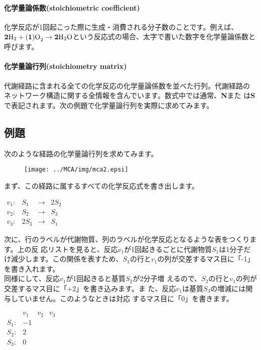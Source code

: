 \paragraph{化学量論係数(stoichiometric coefficient)}
化学反応が1回起こった際に生成・消費される分子数のことです。例えば、${\rm {\bf 2}H}_2 + {\rm ({\bf 1})O}_2 \rightarrow {\rm {\bf 2}H}_2{\rm O}$という反応式の場合、太字で書いた数字を化学量論係数と呼びます。\\

\paragraph{化学量論行列(stoichiometry matrix)}
代謝経路に含まれる全ての化学反応の化学量論係数を並べた行列。代謝経路の
ネットワーク構造に関する全情報を含んでいます。数式中では通常、{\bf N}また
は{\bf S}で表記されます。次の例題で化学量論行列を実際に求めてみます。


\subsection{例題}
次のような経路の化学量論行列を求めてみます。

\begin{figure}[h]
\begin{center}
\texttt{[image: ../MCA/img/mca2.epsi]}
\end{center}
\end{figure}

まず、この経路に属するすべての化学反応式を書き出します。\\

\begin{center}
\(
\begin{array}{lrcr}
v_1: & S_1 & \rightarrow & 2S_2 \\
v_2: & S_2 & \rightarrow & S_3 \\
v_3: & 2S_3 & \rightarrow & S_1 
\end{array}
\)
\end{center}

次に、行のラベルが代謝物質、列のラベルが化学反応となるような表をつくります。上の反
応リストを見ると、反応\(v_1\)が1回起きるごとに代謝物質\(S_1\)は1分子だけ減少します。この関係を表すため、\(S_1\)の行と\(v_1\)の列が交差するマス目に「-1」
を書き入れます。\\

\indent 同様にして、反応\(v_1\)が1回起きると基質\(S_2\)が2分子増
えるので、\(S_2\)の行と\(v_1\)の列が交差するマス目に「+2」を書き込みます。ま
た、反応\(v_1\)は基質\(S_3\)の増減には関与していません。このようなときは対応
するマス目に「0」を書きます。
\begin{center}
\(
\begin{array}{r|rrr}
     & v_1 & v_2 & v_3 \\
\hline
S_1: & -1  &   &  \\
S_2: &  2  &   &  \\
S_3: &  0  &   & \\ 
\end{array}
\)
\end{center}

